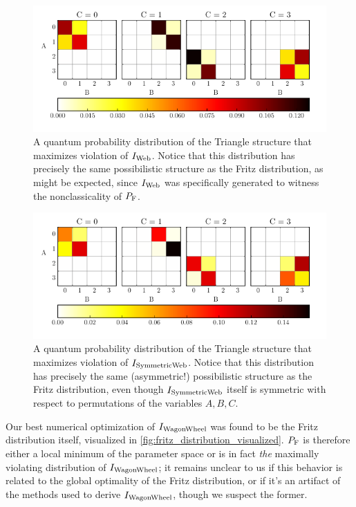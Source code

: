 \documentclass[aps, 10pt, english, twoside, pra, nofootinbib, tightenlines, longbibliography, superscriptaddress]{revtex4-1}
\begin{document}
    \begin{figure}
    \begin{nscenter}
        \includegraphics{figure_plotted_dist_I_1_max_violation.pdf}
        \caption{A quantum probability distribution of the Triangle structure that maximizes violation of $I_\text{Web}$. Notice that this distribution has precisely the same possibilistic structure as the Fritz distribution, as might be expected, since $I_\text{Web}$ was specifically generated to witness the nonclassicality of $\prob[\fritz]$.}
        \label{fig:maximum_violation_I_1}
    \end{nscenter}
    \end{figure}
    \begin{figure}
    \begin{nscenter}
        \includegraphics{figure_plotted_dist_I_3_max_violation.pdf}
        \caption{A quantum probability distribution of the Triangle structure that maximizes violation of $I_\text{SymmetricWeb}$. Notice that this distribution has precisely the same (asymmetric!) possibilistic structure as the Fritz distribution, even though $I_\text{SymmetricWeb}$ itself is symmetric with respect to permutations of the variables $A, B, C$. }
        \label{fig:maximum_violation_I_3}
    \end{nscenter}
    \end{figure}

    Our best numerical optimization of $I_\text{WagonWheel}$ was found to be the Fritz distribution itself, visualized in \cref{fig:fritz_distribution_visualized}. $\prob[\fritz]$ is therefore either a local minimum of the parameter space or is in fact \textit{the} maximally violating distribution of $I_\text{WagonWheel}$; it remains unclear to us if this behavior is related to the global optimality of the Fritz distribution, or if it's an artifact of the methods used to derive $I_\text{WagonWheel}$, though we suspect the former.
\end{document}
